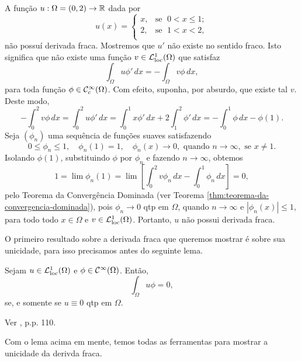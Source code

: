\begin{ex}
    A função $u : \Omega  = (0,2) \to \mathbb{R}$ dada por
    \[
        u(x) = \left\{
            \begin{array}{rl}
                x, & \!\text{se }\; 0 < x \leqslant 1;\\
                2, & \!\text{se }\; 1 < x < 2,\\
            \end{array}
        \right.
    \]
    não possuí derivada fraca.
    Mostremos que $u'$ não existe no sentido fraco.
    Isto significa que não existe uma função $v \in \mathcal{L}^1_{\mathrm{loc}}(\Omega)$ que satisfaz
    \[
        \int_\Omega u \phi' \, dx = -\int_\Omega v \phi \,dx,
    \]
    para toda função $\phi \in \mathcal{C}_c^\infty(\Omega)$. 
    Com efeito, suponha, por absurdo, que existe tal $v$. Deste modo,
    \[
        -\int_0^2 v \phi \, dx = \int_0^2 u \phi' \,dx = \int_0^1 x \phi' \,dx + 2\int_1^2 \phi' \,dx =- \int_0^1 \phi \,dx - \phi(1).
    \]
    Seja $(\phi_n)$ uma sequência de funções suaves satisfazendo
    \[
        0 \leqslant \phi_n \leqslant 1, \quad \phi_n(1) = 1, \quad \phi_n(x) \to 0, \text{ quando } n\to\infty,\text{ se } x \neq 1.
    \]
    Isolando $\phi(1)$, substituindo $\phi$ por $\phi_n$ e fazendo $n \to \infty$, obtemos
    \[
        1 = \lim \phi_n(1) = \lim \left[ \int_0^2 v \phi_n \, dx- \int_0^1 \phi_n \,dx \right] = 0,
    \]
    pelo Teorema da Convergência Dominada (ver Teorema \ref{thm:teorema-da-convergencia-dominada}), pois $\phi_n \to 0$ qtp em $\Omega$, quando $n\to\infty$ e $|\phi_n(x)| \leqslant 1$, para todo todo $x \in \Omega$ e $v \in \mathcal{L}^1_{\mathrm{loc}}(\Omega)$.
    Portanto, $u$ não possui derivada fraca.
\end{ex}

O primeiro resultado sobre a derivada fraca que queremos mostrar é sobre sua unicidade, para isso precisamos antes do seguinte lema.

\begin{lbox} \label{lm:lema}
    Sejam $u \in \mathcal{L}^1_{\mathrm{loc}}(\Omega)$ e $\phi \in \mathcal{C}^\infty(\Omega)$.
    Então,
    \[
        \int_\Omega u \phi = 0,
    \]
    se, e somente se $u \equiv 0$ qtp em $\Omega$.
\end{lbox}
\begin{prf}
    Ver \cite{brezis-functional.analysis}, p.p. 110.
\end{prf}

Com o lema acima em mente, temos todas as ferramentas para mostrar a unicidade da derivda fraca.

